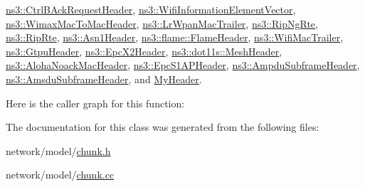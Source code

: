 \hyperlink{classns3_1_1CtrlBAckRequestHeader_a9920f36815c4f5707c19dd0caf514661}{ns3\+::\+Ctrl\+B\+Ack\+Request\+Header}, \hyperlink{classns3_1_1WifiInformationElementVector_a6ece6df025a3aa34da8c36034c93d178}{ns3\+::\+Wifi\+Information\+Element\+Vector}, \hyperlink{classns3_1_1WimaxMacToMacHeader_aa9e76b23c93710be1cba9f5a4777894a}{ns3\+::\+Wimax\+Mac\+To\+Mac\+Header}, \hyperlink{classns3_1_1LrWpanMacTrailer_ac8db76dd0f6a6320bdf00f8ece2cc2b4}{ns3\+::\+Lr\+Wpan\+Mac\+Trailer}, \hyperlink{classns3_1_1RipNgRte_a999529aeb802c517074be14ee5ceba7a}{ns3\+::\+Rip\+Ng\+Rte}, \hyperlink{classns3_1_1RipRte_a5253a36c196d3a8ac3be0f1468ebab1d}{ns3\+::\+Rip\+Rte}, \hyperlink{classns3_1_1Asn1Header_a8b7c035ddfef790a32477dc8895ea99b}{ns3\+::\+Asn1\+Header}, \hyperlink{classns3_1_1flame_1_1FlameHeader_af227b1e4eab39b8281b927e6e8d2ebc9}{ns3\+::flame\+::\+Flame\+Header}, \hyperlink{classns3_1_1WifiMacTrailer_a8639fb7019173bbdc4307c93ba735d53}{ns3\+::\+Wifi\+Mac\+Trailer}, \hyperlink{classns3_1_1GtpuHeader_a1706c066dde7e895f961832d7fed96bf}{ns3\+::\+Gtpu\+Header}, \hyperlink{classns3_1_1EpcX2Header_a4e8ddaca77b69b901c2cb04c4e5ff01e}{ns3\+::\+Epc\+X2\+Header}, \hyperlink{classns3_1_1dot11s_1_1MeshHeader_acf846f77244d80fb3770942851dc943a}{ns3\+::dot11s\+::\+Mesh\+Header}, \hyperlink{classns3_1_1AlohaNoackMacHeader_a3b56d2979519ef93f13c47e2993771c5}{ns3\+::\+Aloha\+Noack\+Mac\+Header}, \hyperlink{classns3_1_1EpcS1APHeader_a6593e00e94e4e66238b94966ce80ce7d}{ns3\+::\+Epc\+S1\+A\+P\+Header}, \hyperlink{classns3_1_1AmpduSubframeHeader_ac4513fb1e5cedb38cd4923269fe5bf38}{ns3\+::\+Ampdu\+Subframe\+Header}, \hyperlink{classns3_1_1AmsduSubframeHeader_afb2d3de2a285ebecf823b6846d51ec4d}{ns3\+::\+Amsdu\+Subframe\+Header}, and \hyperlink{classMyHeader_a92aa779c069cafbe408eef00552665dd}{My\+Header}.



Here is the caller graph for this function\+:




The documentation for this class was generated from the following files\+:\begin{DoxyCompactItemize}
\item 
network/model/\hyperlink{chunk_8h}{chunk.\+h}\item 
network/model/\hyperlink{chunk_8cc}{chunk.\+cc}\end{DoxyCompactItemize}
